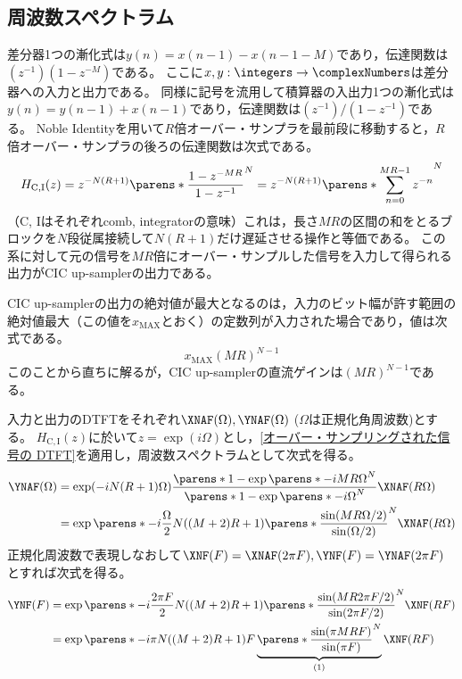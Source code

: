     \subsection{周波数スペクトラム}
        \label{CIC up-sampler の周波数スペクトラム}
        差分器1つの漸化式は$y(n) = x(n-1) - x(n-1-M)$であり，伝達関数は$(z^{-1})(1-z^{-M})$である。
        ここに$x,y:\integers\to\complexNumbers$は差分器への入力と出力である。
        同様に記号を流用して積算器の入出力1つの漸化式は$y(n) = y(n-1) + x(n-1)$であり，伝達関数は$(z^{-1})/(1-z^{-1})$である。
        Noble Identityを用いて$R$倍オーバー・サンプラを最前段に移動すると，$R$倍オーバー・サンプラの後ろの伝達関数は次式である。
        \[ H_\mathrm{C,I}(z) = z^{-N(R+1)}\parens*{\frac{1-z^{-MR}}{1-z^{-1}}}^N = z^{-N(R+1)}\parens*{\sum_{n=0}^{MR-1} z^{-n}}^N \]
        （C, Iはそれぞれcomb, integratorの意味）これは，長さ$MR$の区間の和をとるブロックを$N$段従属接続して$N(R+1)$だけ遅延させる操作と等価である。
        この系に対して元の信号を$MR$倍にオーバー・サンプルした信号を入力して得られる出力がCIC up-samplerの出力である。
        \par
        CIC up-samplerの出力の絶対値が最大となるのは，入力のビット幅が許す範囲の絶対値最大（この値を$x_\mathrm{MAX}$とおく）の定数列が入力された場合であり，値は次式である。
        \begin{equation}
            x_\mathrm{MAX}(MR)^{N-1}
            \label{equation:CIC up-sampler の出力の絶対値の最大値}
        \end{equation}
        このことから直ちに解るが，CIC up-samplerの直流ゲインは$(MR)^{N-1}$である。
        \par
        入力と出力のDTFTをそれぞれ$\XNAF(\Omega), \YNAF(\Omega)$ ($\Omega$は正規化角周波数)とする。
        $H_\mathrm{C,I}(z)$に於いて$z = \exp(i\Omega)$とし，\ref{オーバー・サンプリングされた信号の DTFT}を適用し，周波数スペクトラムとして次式を得る。
        \begin{align*}
            \YNAF(\Omega) &= \exp(-iN(R+1)\Omega)\frac{\parens*{1-\exp\parens*{-iMR\Omega}}^N}{\parens*{1-\exp\parens*{-i\Omega}}^N}\XNAF(R\Omega) \\
            &= \exp\parens*{-i\frac{\Omega}{2}N((M+2)R+1)}\parens*{\frac{\sin(MR\Omega/2)}{\sin(\Omega/2)}}^N \XNAF(R\Omega)
        \end{align*}
        正規化周波数で表現しなおして$\XNF(F) = \XNAF(2\pi F), \YNF(F) = \YNAF(2\pi F)$とすれば次式を得る。
        \begin{align}
            \YNF(F) &= \exp\parens*{-i\frac{2\pi F}{2}N((M+2)R+1)}\parens*{\frac{\sin(MR 2\pi F/2)}{\sin(2\pi F/2)}}^N \XNF(RF) \nonumber \\
            &= \exp\parens*{-i\pi N((M+2)R+1)F}\underbrace{\parens*{\frac{\sin(\pi MRF)}{\sin(\pi F)}}^N}_{(1)} \XNF(RF) \label{equation:CIC up-sampler の周波数スペクトラム}
        \end{align}
